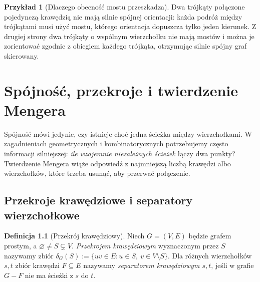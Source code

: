 \documentclass[11pt,a4paper]{report}
\numberwithin{equation}{section}
\theoremstyle{plain}
\theoremstyle{definition}
\newtheorem{definicja}[twierdzenie]{Definicja}
\newtheorem{przyklad}[twierdzenie]{Przykład}
\theoremstyle{remark}
\begin{document}
\begin{przyklad}[Dlaczego obecność mostu przeszkadza]
Dwa trójkąty połączone pojedynczą krawędzią nie mają
silnie spójnej orientacji: każda podróż między trójkątami
musi użyć mostu, którego orientacja dopuszcza tylko jeden
kierunek. Z drugiej strony dwa trójkąty o wspólnym
wierzchołku nie mają mostów i można je zorientować
zgodnie z obiegiem każdego trójkąta, otrzymując
silnie spójny graf skierowany.
\end{przyklad}

\begin{center}
\end{center}

\chapter{Spójność, przekroje i twierdzenie Mengera}
\label{ch:tg-menger}

Spójność mówi jedynie, czy istnieje choć jedna ścieżka między
wierzchołkami. W zagadnieniach geometrycznych i kombinatorycznych
potrzebujemy często informacji silniejszej: \emph{ile wzajemnie
niezależnych ścieżek} łączy dwa punkty? Twierdzenie Mengera
wiąże odpowiedź z najmniejszą liczbą krawędzi albo wierzchołków,
które trzeba usunąć, aby przerwać połączenie.

\section{Przekroje krawędziowe i separatory wierzchołkowe}
\label{sec:tg-cuts}

\begin{definicja}[Przekrój krawędziowy]
Niech $G=(V,E)$ będzie grafem prostym, a
$\varnothing\ne S\subsetneq V$. \emph{Przekrojem krawędziowym}
wyznaczonym przez $S$ nazywamy zbiór
$\delta_G(S):=\{uv\in E:u\in S,\ v\in V\setminus S\}$.
Dla różnych wierzchołków $s,t$ zbiór krawędzi $F\subseteq E$
nazywamy \emph{separatorem krawędziowym $s,t$}, jeśli
w grafie $G-F$ nie ma ścieżki z $s$ do $t$.
\end{definicja}
\end{document}
